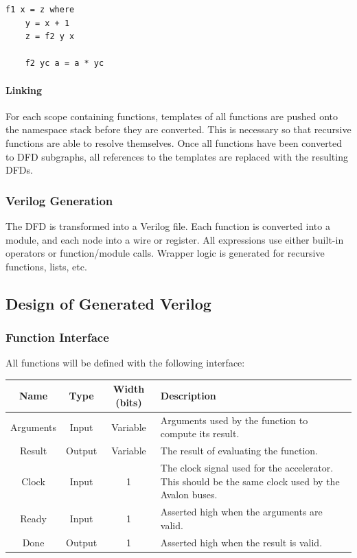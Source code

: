 \documentclass[english,onecolumn]{article}
\begin{document}
\begin{lstlisting}[caption={The function from Listing \ref{lst:closure}, rewritten to use arguments.}]
f1 x = z where
    y = x + 1
    z = f2 y x

    f2 yc a = a * yc
\end{lstlisting}

\paragraph{Linking}
For each scope containing functions, templates of all functions are pushed onto the namespace stack before they are converted. This is necessary so that recursive functions are able to resolve themselves. Once all functions have been converted to DFD subgraphs, all references to the templates are replaced with the resulting DFDs.

\subsubsection{Verilog Generation}
The DFD is transformed into a Verilog file. Each function is converted into a module, and each node into a wire or register. All expressions use either built-in operators or function/module calls. Wrapper logic is generated for recursive functions, lists, etc.

\subsection{Design of Generated Verilog}
\subsubsection{Function Interface}
\label{s:functionInterface}
All functions will be defined with the following interface:

\begin{tabularx}{\textwidth}{|c|c|c|X|}
\hline 
Name & Type & Width (bits) & Description \\ \hline 
Arguments & Input & Variable & Arguments used by the function to compute its result. \\ \hline 
Result & Output & Variable & The result of evaluating the function. \\ \hline 
Clock & Input & 1 & The clock signal used for the accelerator. This should be the same clock used by the Avalon buses. \\ \hline 
Ready & Input & 1 & Asserted high when the arguments are valid. \\ \hline 
Done & Output & 1 & Asserted high when the result is valid. \\ \hline
\end{tabularx} 
\end{document}
